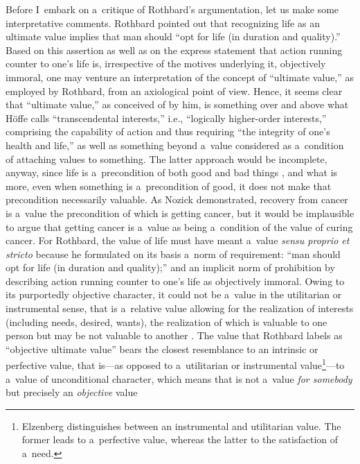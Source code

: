 Before I~embark on a~critique of Rothbard's argumentation, let us make some interpretative comments. Rothbard pointed out that recognizing life as an ultimate value implies that man should ``opt for life (in duration and quality).'' Based on this assertion as well as on the express statement that action running counter to one's life is, irrespective of the motives underlying it, objectively immoral, one may venture an interpretation of the concept of ``ultimate value,'' as employed by Rothbard, from an axiological point of view. Hence, it seems clear that ``ultimate value,'' as conceived of by him, is something over and above what Höffe 
\parencite*[][pp.26–27]{} %
 calls ``transcendental interests,'' i.e., ``logically higher-order interests,'' comprising the capability of action and thus requiring ``the integrity of one's health and life,'' as well as something beyond a~value considered as a~condition of attaching values to something. The latter approach would be incomplete, anyway, since life is a~precondition of both good and bad things 
\parencite[][p.8]{}, %
 and what is more, even when something is a~precondition of good, it does not make that precondition necessarily valuable. As Nozick 
\parencite*[][p.252]{} %
 demonstrated, recovery from cancer is a~value the precondition of which is getting cancer, but it would be implausible to argue that getting cancer is a~value as being a~condition of the value of curing cancer. For Rothbard, the value of life must have meant a~value \textit{sensu proprio et stricto} because he formulated on its basis a~norm of requirement: ``man should opt for life (in duration and quality);'' and an implicit norm of prohibition by describing action running counter to one's life as objectively immoral. Owing to its purportedly objective character, it could not be a~value in the utilitarian or instrumental sense, that is a~relative value allowing for the realization of interests (including needs, desired, wants), the realization of which is valuable to one person but may be not valuable to another 
\parencites[see][p.21]{}[][p.77]{}. %
 The value that Rothbard labels as ``objective ultimate value'' bears the closest resemblance to an intrinsic or perfective value, that is---as opposed to a~utilitarian or instrumental value\footnote{Elzenberg 
\parencite*[][pp.28–29]{} %
 distinguishes between an instrumental and utilitarian value. The former leads to a~perfective value, whereas the latter to the satisfaction of a~need.}---to a~value of unconditional character, which means that is not a~value \textit{for somebody} but precisely an \textit{objective} value 
